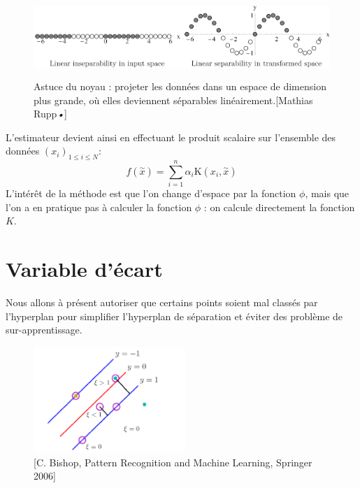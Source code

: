 \documentclass[a4paper,12pt,titlepage]{report}
\begin{document}
\begin{figure}[!h]
	\begin{center}
		\includegraphics[height = 3cm, keepaspectratio]{graphes/separation.png}
		\caption{Astuce du noyau : projeter les données dans un espace de dimension plus grande, où elles deviennent séparables linéairement.[Mathias Rupp\textit\textit{•}]}
	\end{center}
\end{figure}

L'estimateur devient ainsi en effectuant le produit scalaire sur l'ensemble des données $(x_{i})_{1 \leqslant i \leqslant N}$:
\[
f(\overset{\sim}{x}) = \sum_{i = 1}^{n}{\alpha_i \text{K}(x_i , \overset{\sim}{x})}
\]	
L'intérêt de la méthode est que l'on change d'espace par la fonction $\phi$, mais que l'on a en pratique pas à calculer la fonction $\phi$ : on calcule directement la fonction $K$.

\section{Variable d'écart}	

Nous allons à présent autoriser que certains points soient mal classés par l'hyperplan	pour simplifier l'hyperplan de séparation et éviter des problème de sur-apprentissage.
\begin{figure}[!h]
	\begin{center}
		\includegraphics[height = 4cm, keepaspectratio]{graphes/ecart.png}
		\caption{[C. Bishop, Pattern Recognition and Machine Learning, Springer 2006]}
	\end{center}
\end{figure}
\end{document}
